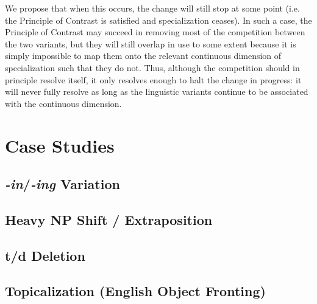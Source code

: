 We propose that when this occurs, the change will still stop at some point (i.e. the Principle of Contrast is satisfied and specialization ceases).
In such a case, the Principle of Contrast may succeed in removing most of the competition between the two variants, but they will still overlap in use to some extent because it is simply impossible to map them onto the relevant continuous dimension of specialization such that they do not.
Thus, although the competition should in principle resolve itself, it only resolves enough to halt the change in progress: it will never fully resolve as long as the linguistic variants continue to be associated with the continuous dimension.


\section{Case Studies}
\label{cases}

\subsection{\textsl{-in}/\textsl{-ing} Variation}

\subsection{Heavy NP Shift / Extraposition}

\subsection{t/d Deletion}

\subsection{Topicalization (English Object Fronting)}
\label{topsect}

